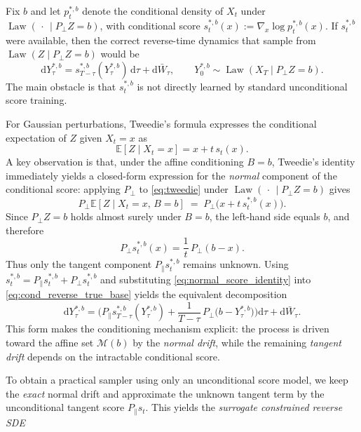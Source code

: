 \documentclass[twoside,11pt]{article}
\newcommand{\E}{\mathbb{E}}
\newcommand{\dd}{\mathrm{d}}
\newcommand{\Mc}{\mathcal{M}}
\newcommand{\Law}{\operatorname{Law}}
\numberwithin{equation}{section}
\begin{document}
Fix \(b\) and let \(p_t^{*,b}\) denote the conditional density of \(X_t\) under \(\Law(\,\cdot\,\mid P_{\perp}Z =b)\), with
conditional score \(s_t^{*,b}(x):=\nabla_x\log p_t^{*,b}(x)\).
If \(s_t^{*,b}\) were available, then the correct reverse-time dynamics that sample from
\(\Law(Z\mid P_{\perp}Z =b)\) would be
\begin{equation}\label{eq:cond_reverse_true_base}
\dd Y_\tau^{*,b}
=
s_{T-\tau}^{*,b}(Y_\tau^{*,b})\,\dd\tau
+
\dd \bar W_\tau,
\qquad
Y_0^{*,b}\sim \Law(X_T\mid P_{\perp}Z =b).
\end{equation}
The main obstacle is that \(s_t^{*,b}\) is not directly learned by standard unconditional score training. 


For Gaussian perturbations, Tweedie’s formula expresses the conditional expectation of 
$Z$ given $X_t=x$
as
\begin{equation}\label{eq:tweedie}
\E[Z\mid X_t=x] = x + t\,s_t(x).
\end{equation}
A key observation is that, under the affine conditioning \(B=b\), Tweedie's identity immediately yields a closed-form expression for the \emph{normal} component of the conditional score: applying \(P_\perp\) to \eqref{eq:tweedie} under \(\Law(\,\cdot\,\mid P_{\perp}Z =b)\) gives
\[
P_\perp \E[Z\mid X_t=x,\,B=b] \;=\; P_\perp\big(x + t\,s_t^{*,b}(x)\big).
\]
Since \(P_\perp Z=b\) holds almost surely under \(B=b\), the left-hand side equals \(b\), and therefore
\begin{equation}\label{eq:normal_score_identity}
P_{\perp}s_t^{*,b}(x)=\frac{1}{t}\,P_{\perp}(b-x).
\end{equation}
Thus only the tangent component \(P_\parallel s_t^{*,b}\) remains unknown. Using
\(s_t^{*,b}=P_\parallel s_t^{*,b}+P_\perp s_t^{*,b}\) and substituting \eqref{eq:normal_score_identity} into
\eqref{eq:cond_reverse_true_base} yields the equivalent decomposition
\begin{equation}\label{eq:cond_reverse_true_rewrite}
\dd Y_\tau^{*,b}
=
\Big(
P_{\parallel}s_{T-\tau}^{*,b}(Y_\tau^{*,b})
+
\frac{1}{T-\tau}\,P_{\perp}\big(b-Y_\tau^{*,b}\big)
\Big)\dd \tau
+
\dd \bar W_\tau.
\end{equation}
This form makes the conditioning mechanism explicit: the process is driven toward the affine set \(\Mc(b)\) by the
{\it normal drift}, while the remaining {\it tangent drift} depends on the intractable conditional score.

To obtain a practical sampler using only an unconditional score model, we keep the \emph{exact} normal drift and
approximate the unknown tangent term by the unconditional tangent score \(P_\parallel s_t\). This yields the
{\it surrogate constrained reverse SDE} 
\end{document}

